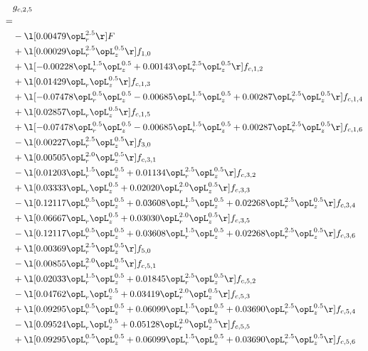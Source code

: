 \begin{alignat}{2} 
\label{eq:g_25_0} 
& g_{c,2,5} \nonumber \\ 
 = \\ 
& - \l[  0.00479 \opL_r^{2.5}  \r] F \nonumber \\ 
& + \l[  0.00029 \opL_r^{2.5} \opL_z^{0.5}  \r] f_{1,0} \nonumber \\ 
& + \l[  -0.00228 \opL_r^{1.5} \opL_z^{0.5} +  0.00143 \opL_r^{2.5} \opL_z^{0.5}  \r] f_{c,1,2} \nonumber \\ 
& + \l[  0.01429 \opL_r \opL_z^{0.5}  \r] f_{c,1,3} \nonumber \\ 
& + \l[  -0.07478 \opL_r^{0.5} \opL_z^{0.5}   -0.00685 \opL_r^{1.5} \opL_z^{0.5} +  0.00287 \opL_r^{2.5} \opL_z^{0.5}  \r] f_{c,1,4} \nonumber \\ 
& + \l[  0.02857 \opL_r \opL_z^{0.5}  \r] f_{c,1,5} \nonumber \\ 
& + \l[  -0.07478 \opL_r^{0.5} \opL_z^{0.5}   -0.00685 \opL_r^{1.5} \opL_z^{0.5} +  0.00287 \opL_r^{2.5} \opL_z^{0.5}  \r] f_{c,1,6} \nonumber \\ 
& - \l[  0.00227 \opL_r^{2.5} \opL_z^{0.5}  \r] f_{3,0} \nonumber \\ 
& + \l[  0.00505 \opL_r^{2.0} \opL_z^{0.5}  \r] f_{c,3,1} \nonumber \\ 
& - \l[  0.01203 \opL_r^{1.5} \opL_z^{0.5} +  0.01134 \opL_r^{2.5} \opL_z^{0.5}  \r] f_{c,3,2} \nonumber \\ 
& + \l[  0.03333 \opL_r \opL_z^{0.5} +  0.02020 \opL_r^{2.0} \opL_z^{0.5}  \r] f_{c,3,3} \nonumber \\ 
& - \l[  0.12117 \opL_r^{0.5} \opL_z^{0.5} +  0.03608 \opL_r^{1.5} \opL_z^{0.5} +  0.02268 \opL_r^{2.5} \opL_z^{0.5}  \r] f_{c,3,4} \nonumber \\ 
& + \l[  0.06667 \opL_r \opL_z^{0.5} +  0.03030 \opL_r^{2.0} \opL_z^{0.5}  \r] f_{c,3,5} \nonumber \\ 
& - \l[  0.12117 \opL_r^{0.5} \opL_z^{0.5} +  0.03608 \opL_r^{1.5} \opL_z^{0.5} +  0.02268 \opL_r^{2.5} \opL_z^{0.5}  \r] f_{c,3,6} \nonumber \\ 
& + \l[  0.00369 \opL_r^{2.5} \opL_z^{0.5}  \r] f_{5,0} \nonumber \\ 
& - \l[  0.00855 \opL_r^{2.0} \opL_z^{0.5}  \r] f_{c,5,1} \nonumber \\ 
& + \l[  0.02033 \opL_r^{1.5} \opL_z^{0.5} +  0.01845 \opL_r^{2.5} \opL_z^{0.5}  \r] f_{c,5,2} \nonumber \\ 
& - \l[  0.04762 \opL_r \opL_z^{0.5} +  0.03419 \opL_r^{2.0} \opL_z^{0.5}  \r] f_{c,5,3} \nonumber \\ 
& + \l[  0.09295 \opL_r^{0.5} \opL_z^{0.5} +  0.06099 \opL_r^{1.5} \opL_z^{0.5} +  0.03690 \opL_r^{2.5} \opL_z^{0.5}  \r] f_{c,5,4} \nonumber \\ 
& - \l[  0.09524 \opL_r \opL_z^{0.5} +  0.05128 \opL_r^{2.0} \opL_z^{0.5}  \r] f_{c,5,5} \nonumber \\ 
& + \l[  0.09295 \opL_r^{0.5} \opL_z^{0.5} +  0.06099 \opL_r^{1.5} \opL_z^{0.5} +  0.03690 \opL_r^{2.5} \opL_z^{0.5}  \r] f_{c,5,6} \nonumber \\ 
\end{alignat} 


